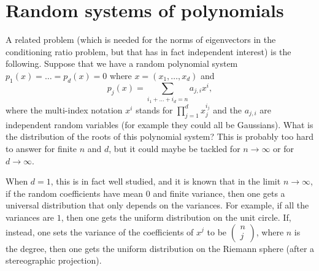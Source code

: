 \documentclass[12pt]{article}
\begin{document}
\newpage

\section{Random systems of polynomials}

A related problem (which is needed for the norms of eigenvectors in the conditioning ratio problem, but that has in fact independent interest) is the following. Suppose that we have a random polynomial system $p_1(x)=\dots=p_d(x)=0$ where $x=(x_1,\dots,x_d)$ and
\[  p_j(x) = \sum_{i_1 + \dots + i_d = n}  a_{j,i} x^i,   \]
where the multi-index notation $x^i$ stands for $\prod_{j=1}^d x_j^{i_j}$ and the $a_{j,i}$ are independent random variables (for example they could all be Gaussians). What is the distribution of the roots of this polynomial system? This is probably too hard to answer for finite $n$ and $d$, but it could maybe be tackled for $n \rightarrow \infty$ or for $d \rightarrow \infty$.

When $d=1$, this is in fact well studied, and it is known that in the limit $n \rightarrow \infty$, if the random coefficients have mean $0$ and finite variance, then one gets a universal distribution that only depends on the variances. For example, if all the variances are $1$, then one gets the uniform distribution on the unit circle. If, instead, one sets the variance of the coefficients of $x^j$ to be $\begin{pmatrix}
    n\\
    j
\end{pmatrix}$, where $n$ is the degree, then one gets the uniform distribution on the Riemann sphere (after a stereographic projection).
\end{document}
